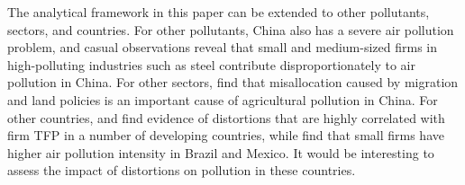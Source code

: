 \documentclass[AEJ]{AEA}
\begin{document}
The analytical framework in this paper can be extended to other pollutants, sectors, and countries. For other pollutants, China also has a severe air pollution problem, and casual observations reveal that small and medium-sized firms in high-polluting industries such as steel contribute disproportionately to air pollution in China. For other sectors, \citet{AGpaper} find that misallocation caused by migration and land policies is an important cause of agricultural pollution in China. For other countries, \citet{HsiehKlenow:2014} and \citet{BentoRestuccia:2016} find evidence of distortions that are highly correlated with firm TFP in a number of developing countries, while \citet{Dasguptaetal:1998} find that small firms have higher air pollution intensity in Brazil and Mexico. It would be interesting to assess the impact of distortions on pollution in these countries.



\end{document}
